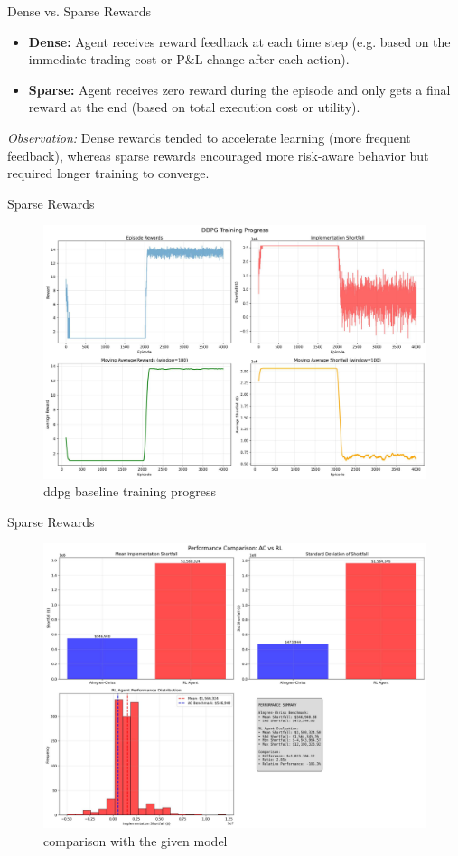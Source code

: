 \documentclass[11pt,aspectratio=169]{beamer}   %
\begin{document}
\begin{frame}{Dense vs. Sparse Rewards}
	\begin{itemize}
		\item \textbf{Dense:} Agent receives reward feedback at each time step (e.g. based on the immediate trading cost or P\&L change after each action).
		\item \textbf{Sparse:} Agent receives zero reward during the episode and only gets a final reward at the end (based on total execution cost or utility).
	\end{itemize}
	\pause
	\textit{Observation:} Dense rewards tended to accelerate learning (more frequent feedback), whereas sparse rewards encouraged more risk-aware behavior but required longer training to converge.
	\vspace{0.5em}
\end{frame}

\begin{frame}{Sparse Rewards}
	\begin{figure}[ht]
		\centering
		\includegraphics[width=0.6\linewidth]{training_progress.pdf}
		\caption{ddpg baseline training progress}
	\end{figure}
\end{frame}

\begin{frame}{Sparse Rewards}
	\begin{figure}[ht]
		\centering
		\includegraphics[width=0.6\linewidth]{performance_comparison_baseline.pdf}
		\caption{comparison with the given model}
	\end{figure}
\end{frame}
\end{document}
